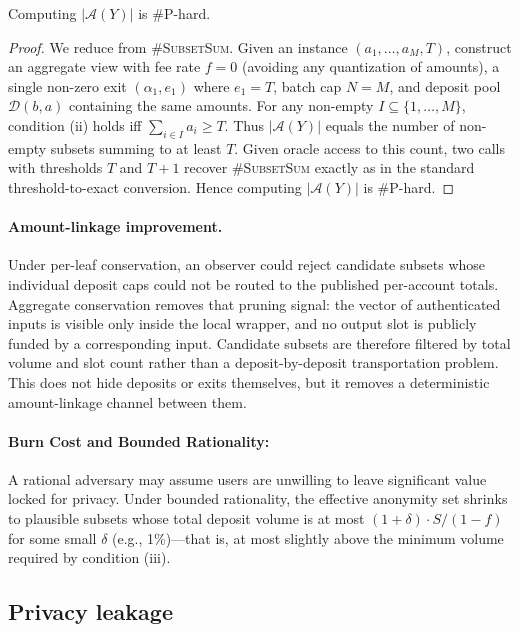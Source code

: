 \documentclass{iacrcc}
\begin{document}
\begin{theorem}
\label{thm:hardness}
Computing \(|\mathcal{A}(Y)|\) is \#P-hard.
\end{theorem}

\begin{proof}
We reduce from \textsc{\#SubsetSum}. Given an instance \((a_1, \ldots, a_M, T)\), construct an aggregate view with fee rate \(f = 0\) (avoiding any quantization of amounts), a single non-zero exit \((\alpha_1, e_1)\) where \(e_1 = T\), batch cap \(N = M\), and deposit pool \(\mathcal{D}(b,a)\) containing the same amounts. For any non-empty \(I \subseteq \{1,\ldots,M\}\), condition (ii) holds iff \(\sum_{i \in I} a_i \geq T\). Thus \(|\mathcal{A}(Y)|\) equals the number of non-empty subsets summing to at least \(T\). Given oracle access to this count, two calls with thresholds \(T\) and \(T+1\) recover \textsc{\#SubsetSum} exactly as in the standard threshold-to-exact conversion. Hence computing \(|\mathcal{A}(Y)|\) is \#P-hard.
\end{proof}

\paragraph{Amount-linkage improvement.}
Under per-leaf conservation, an observer could reject candidate subsets whose individual deposit caps could not be routed to the published per-account totals. Aggregate conservation removes that pruning signal: the vector of authenticated inputs is visible only inside the local wrapper, and no output slot is publicly funded by a corresponding input. Candidate subsets are therefore filtered by total volume and slot count rather than a deposit-by-deposit transportation problem. This does not hide deposits or exits themselves, but it removes a deterministic amount-linkage channel between them.

\paragraph{Burn Cost and Bounded Rationality:}
A rational adversary may assume users are unwilling to leave significant value locked for privacy. Under bounded rationality, the effective anonymity set shrinks to plausible subsets whose total deposit volume is at most \((1 + \delta) \cdot S/(1-f)\) for some small \(\delta\) (e.g., 1\%)---that is, at most slightly above the minimum volume required by condition (iii).

\subsection{Privacy leakage}
\end{document}

